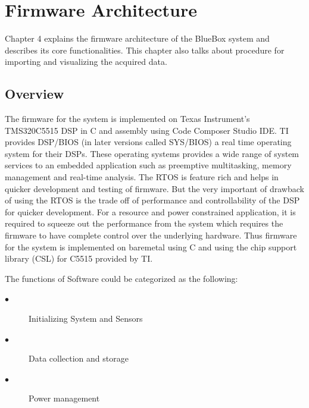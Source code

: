 \chapter{Firmware Architecture}

Chapter 4 explains the firmware architecture of the BlueBox system and describes its core functionalities. This chapter also talks about procedure for importing and visualizing the acquired data.

\section{Overview}
The firmware for the system is implemented on Texas Instrument's TMS320C5515 DSP in C and assembly using Code Composer Studio IDE. TI provides DSP/BIOS (in later versions called SYS/BIOS)  a real time operating system for their DSPs. These operating systems provides a wide range of system services to an embedded application such as preemptive multitasking, memory management and real-time analysis. The RTOS is feature rich and helps in quicker development and testing of firmware. But the very important of drawback of using the RTOS is the trade off of performance and controllability of the DSP for quicker development. For a resource and power constrained application, it is required to squeeze out the performance from the system which requires the firmware to have complete control over the underlying hardware. Thus firmware for the system is implemented on baremetal using  C and using the chip support library (CSL) for C5515 provided by TI. 


\vfill

The functions of Software could be categorized as the following:
 \begin{description}
 	\item[$\bullet$]
Initializing System and Sensors 
 	\item[$\bullet$]
Data collection and storage
 	\item[$\bullet$]  
Power management 
 \end{description}

